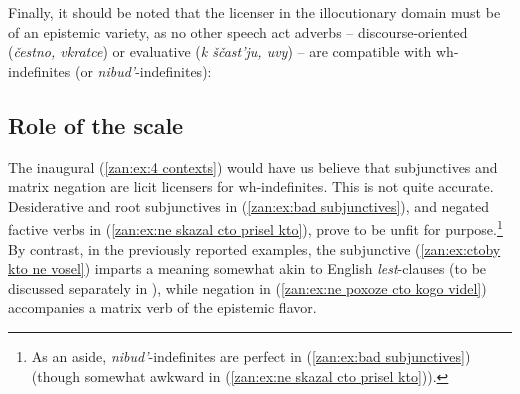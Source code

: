 \documentclass[output=paper,colorlinks,citecolor=brown]{langscibook}
\begin{document}
\z
\z

\noindent Finally, it should be noted that the licenser in the illocutionary domain must be of an epistemic variety, as no other speech act adverbs -- discourse-oriented (\textit{čestno, vkratce}) or evaluative (\textit{k ščast'ju, uvy}) -- are compatible with wh-indefinites (or \textit{nibud'}-indefinites):


\z


\subsection{Role of the scale}\label{zan:subsec:scale}
 The inaugural (\ref{zan:ex:4 contexts}) would have us believe that subjunctives and matrix negation are licit licensers for wh-indefinites. This is not quite accurate. Desiderative and root subjunctives in (\ref{zan:ex:bad subjunctives}), and negated factive verbs in (\ref{zan:ex:ne skazal cto prisel kto}), prove to be unfit for purpose.\footnote{As an aside, \textit{nibud'}-indefinites are perfect in (\ref{zan:ex:bad subjunctives}) (though somewhat awkward in (\ref{zan:ex:ne skazal cto prisel kto})).} By contrast, in the previously reported examples, the subjunctive (\ref{zan:ex:ctoby kto ne vosel}) imparts a meaning somewhat akin to English \textit{lest}-clauses (to be discussed separately in ), while negation in (\ref{zan:ex:ne poxoze cto kogo videl}) accompanies a matrix verb of the epistemic flavor.

\ea \label{zan:ex:bad subjunctives}
\z
\z
\end{document}

